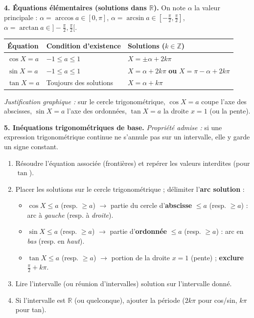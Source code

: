 \documentclass[11pt]{article}
\newcommand{\cle}[1]{{\popxbold\color{popdark}#1}}
\begin{document}
\begin{aretenir}
\textbf{4. Équations élémentaires (solutions dans $\mathbb{R}$).}
On note $\alpha$ la \cle{valeur principale} : $\alpha=\arccos a\in[0,\pi]$, $\alpha=\arcsin a\in[-\frac{\pi}{2},\frac{\pi}{2}]$, $\alpha=\arctan a\in]-\frac{\pi}{2},\frac{\pi}{2}[$.
\begin{center}
\begin{tabularx}{\linewidth}{|l|X|X|}\hline
\rowcolor{popgreenL} \textbf{Équation} & \textbf{Condition d'existence} & \textbf{Solutions ($k\in\mathbb{Z}$)} \\ \hline
$\cos X=a$ & $-1\le a\le 1$ & $X=\pm\alpha+2k\pi$ \\ \hline
$\sin X=a$ & $-1\le a\le 1$ & $X=\alpha+2k\pi$ \textbf{ ou } $X=\pi-\alpha+2k\pi$ \\ \hline
$\tan X=a$ & Toujours des solutions & $X=\alpha+k\pi$ \\ \hline
\end{tabularx}
\end{center}
\emph{Justification graphique :} sur le cercle trigonométrique, $\cos X=a$ coupe l'axe des abscisses, $\sin X=a$ l'axe des ordonnées, $\tan X=a$ la droite $x=1$ (ou la pente).

\textbf{5. Inéquations trigonométriques de base.}
\emph{Propriété admise :} si une expression trigonométrique continue ne s'annule pas sur un intervalle, elle y garde un \cle{signe constant}.
\begin{methode}
\begin{enumerate}
  \item Résoudre l'équation associée (frontières) et repérer les valeurs interdites (pour $\tan$).
  \item Placer les solutions sur le cercle trigonométrique ; délimiter l'\textbf{arc solution} :
  \begin{itemize}
    \item $\cos X \le a$ (resp. $\ge a$) $\rightarrow$ partie du cercle d'\textbf{abscisse} $\le a$ (resp. $\ge a$) : arc à \emph{gauche} (resp. à \emph{droite}).
    \item $\sin X \le a$ (resp. $\ge a$) $\rightarrow$ partie d'\textbf{ordonnée} $\le a$ (resp. $\ge a$) : arc en \emph{bas} (resp. en \emph{haut}).
    \item $\tan X \le a$ (resp. $\ge a$) $\rightarrow$ portion de la droite $x=1$ (pente) ; \textbf{exclure} $\frac{\pi}{2}+k\pi$.
  \end{itemize}
  \item Lire l'intervalle (ou réunion d'intervalles) solution sur l'intervalle donné.
  \item Si l'intervalle est $\mathbb{R}$ (ou quelconque), ajouter la période ($2k\pi$ pour cos/sin, $k\pi$ pour tan).
\end{enumerate}
\end{methode}
\end{aretenir}
\end{document}
